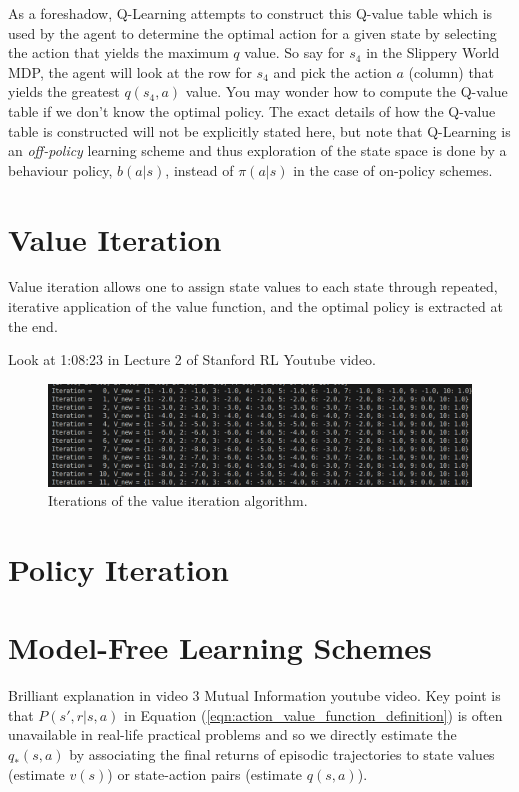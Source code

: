 \documentclass[a4paper,11pt]{article}
\begin{document}
As a foreshadow, Q-Learning attempts to construct this Q-value table which is used by the agent to determine the optimal action for a given state by selecting the action that yields the maximum $q$ value.  So say for $s_4$ in the Slippery World MDP, the agent will look at the row for $s_4$ and pick the action $a$ (column) that yields the greatest $q(s_4, a)$ value.  You may wonder how to compute the Q-value table if we don't know the optimal policy.  The exact details of how the Q-value table is constructed will not be explicitly stated here, but note that Q-Learning is an {\it off-policy} learning scheme and thus exploration of the state space is done by a behaviour policy, $b(a|s)$, instead of $\pi(a|s)$ in the case of on-policy schemes.



\section{Value Iteration}

Value iteration allows one to assign state values to each state through repeated, iterative application of the value function, and the optimal policy is extracted at the end.  

Look at 1:08:23 in Lecture 2 of Stanford RL Youtube video.


\begin{figure}
    \includegraphics[width=\textwidth]{images/iters-of-value-iteration-1d-grid-world-code-output.png}
    \caption{Iterations of the value iteration algorithm.}
    \label{fig:iters-of-value-iteration-1d-grid-world-code-output}
\end{figure}


\section{Policy Iteration}


\section{Model-Free Learning Schemes}

Brilliant explanation in video 3 Mutual Information youtube video.  Key point is that $P(s',r|s,a)$ in Equation (\ref{eqn:action_value_function_definition}) is often unavailable in real-life practical problems and so we directly estimate the $q_*(s,a)$ by associating the final returns of episodic trajectories to state values (estimate $v(s)$) or state-action pairs (estimate $q(s,a)$).
\end{document}
